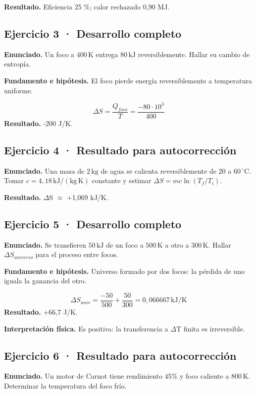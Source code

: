 \documentclass[11pt,a4paper]{article}
\begin{document}
\textbf{Resultado.} Eficiencia 25 \%; calor rechazado 0,90 MJ.


\subsection*{Ejercicio 3 · Desarrollo completo}
\textbf{Enunciado.} Un foco a \(400\,\mathrm K\) entrega \(80\,\mathrm{kJ}\) reversiblemente. Hallar su cambio de entropía.

\textbf{Fundamento e hipótesis.} El foco pierde energía reversiblemente a temperatura uniforme.

\[
\Delta S=\frac{Q_{foco}}{T}=\frac{-80\cdot10^3}{400}
\]
\textbf{Resultado.} -200 J/K.


\subsection*{Ejercicio 4 · Resultado para autocorrección}
\textbf{Enunciado.} Una masa de \(2\,\mathrm{kg}\) de agua se calienta reversiblemente de \(20\) a \(60\,^\circ\mathrm C\). Tomar \(c=4{,}18\,\mathrm{kJ/(kg\,K)}\) constante y estimar \(\Delta S=mc\ln(T_f/T_i)\).

\textbf{Resultado.} \ensuremath{\Delta}S \ensuremath{\approx} +1,069 kJ/K.


\subsection*{Ejercicio 5 · Desarrollo completo}
\textbf{Enunciado.} Se transfieren \(50\,\mathrm{kJ}\) de un foco a \(500\,\mathrm K\) a otro a \(300\,\mathrm K\). Hallar \(\Delta S_{universo}\) para el proceso entre focos.

\textbf{Fundamento e hipótesis.} Universo formado por dos focos: la pérdida de uno iguala la ganancia del otro.

\[
\Delta S_{univ}=\frac{-50}{500}+\frac{50}{300}=0{,}066667\,\mathrm{kJ/K}
\]
\textbf{Resultado.} +66,7 J/K.

\textbf{Interpretación física.} Es positiva: la transferencia a \ensuremath{\Delta}T finita es irreversible.


\subsection*{Ejercicio 6 · Resultado para autocorrección}
\textbf{Enunciado.} Un motor de Carnot tiene rendimiento \(45\%\) y foco caliente a \(800\,\mathrm K\). Determinar la temperatura del foco frío.
\end{document}
